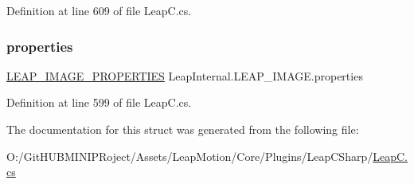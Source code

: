 Definition at line 609 of file Leap\+C.\+cs.

\mbox{\label{struct_leap_internal_1_1_l_e_a_p___i_m_a_g_e_a3b83f7ce1ccf101f5db8dc4b69c4f7d5}} 
\subsubsection{\texorpdfstring{properties}{properties}}
{\footnotesize\ttfamily \mbox{\hyperlink{struct_leap_internal_1_1_l_e_a_p___i_m_a_g_e___p_r_o_p_e_r_t_i_e_s}{L\+E\+A\+P\+\_\+\+I\+M\+A\+G\+E\+\_\+\+P\+R\+O\+P\+E\+R\+T\+I\+ES}} Leap\+Internal.\+L\+E\+A\+P\+\_\+\+I\+M\+A\+G\+E.\+properties}



Definition at line 599 of file Leap\+C.\+cs.



The documentation for this struct was generated from the following file\+:\begin{DoxyCompactItemize}
\item 
O\+:/\+Git\+H\+U\+B\+M\+I\+N\+I\+P\+Roject/\+Assets/\+Leap\+Motion/\+Core/\+Plugins/\+Leap\+C\+Sharp/\mbox{\hyperlink{_leap_c_8cs}{Leap\+C.\+cs}}\end{DoxyCompactItemize}
